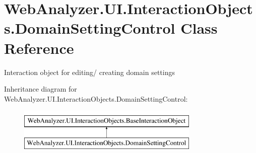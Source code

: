 \hypertarget{class_web_analyzer_1_1_u_i_1_1_interaction_objects_1_1_domain_setting_control}{}\section{Web\+Analyzer.\+U\+I.\+Interaction\+Objects.\+Domain\+Setting\+Control Class Reference}
\label{class_web_analyzer_1_1_u_i_1_1_interaction_objects_1_1_domain_setting_control}


Interaction object for editing/ creating domain settings  


Inheritance diagram for Web\+Analyzer.\+U\+I.\+Interaction\+Objects.\+Domain\+Setting\+Control\+:\begin{figure}[H]
\begin{center}
\leavevmode
\includegraphics[height=2.000000cm]{class_web_analyzer_1_1_u_i_1_1_interaction_objects_1_1_domain_setting_control}
\end{center}
\end{figure}
